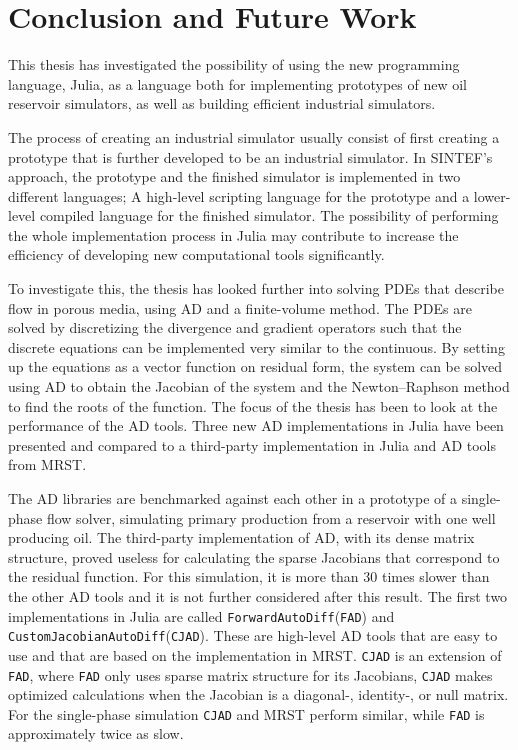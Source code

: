 \chapter{Conclusion and Future Work}
\label{ch:Conclusion}
This thesis has investigated the possibility of using the new programming language, Julia, as a language both for implementing prototypes of new oil reservoir simulators, as well as building efficient industrial simulators. 

The process of creating an industrial simulator usually consist of first creating a prototype that is further developed to be an industrial simulator. In SINTEF's approach, the prototype and the finished simulator is implemented in two different languages; A high-level scripting language for the prototype and a lower-level compiled language for the finished simulator. The possibility of performing the whole implementation process in Julia may contribute to increase the efficiency of developing new computational tools significantly.

To investigate this, the thesis has looked further into solving PDEs that describe flow in porous media, using AD and a finite-volume method. The PDEs are solved by discretizing the divergence and gradient operators such that the discrete equations can be implemented very similar to the continuous. By setting up the equations as a vector function on residual form, the system can be solved using AD to obtain the Jacobian of the system and the Newton--Raphson method to find the roots of the function. The focus of the thesis has been to look at the performance of the AD tools. Three new AD implementations in Julia have been presented and compared to a third-party implementation in Julia and AD tools from MRST. 

The AD libraries are benchmarked against each other in a prototype of a single-phase flow solver, simulating primary production from a reservoir with one well producing oil. The third-party implementation of AD, with its dense matrix structure, proved useless for calculating the sparse Jacobians that correspond to the residual function. For this simulation, it is more than 30 times slower than the other AD tools and it is not further considered after this result. The first two implementations in Julia are called \texttt{ForwardAutoDiff}(\texttt{FAD}) and \texttt{CustomJacobianAutoDiff}(\texttt{CJAD}). These are high-level AD tools that are easy to use and that are based on the implementation in MRST. \texttt{CJAD} is an extension of \texttt{FAD}, where \texttt{FAD} only uses sparse matrix structure for its Jacobians, \texttt{CJAD} makes optimized calculations when the Jacobian is a diagonal-, identity-, or null matrix. For the single-phase simulation \texttt{CJAD} and MRST perform similar, while \texttt{FAD} is approximately twice as slow. 

